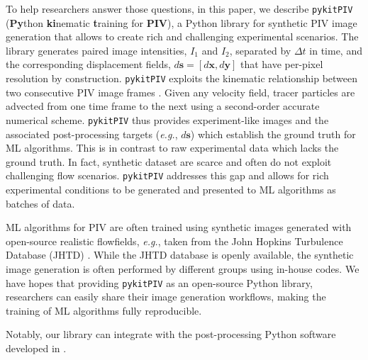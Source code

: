 \documentclass[a4paper,fleqn]{cas-dc}
\begin{document}
To help researchers answer those questions, in this paper, we describe \texttt{pykitPIV} (\textbf{Py}thon \textbf{ki}nematic \textbf{t}raining for \textbf{PIV}), a Python library for synthetic PIV image generation that allows to create rich and challenging experimental scenarios. The library generates paired image intensities, $I_1$ and $I_2$, separated by $\Delta t$ in time, and the corresponding displacement fields, $d\mathbf{s} = [d \mathbf{x}, d\mathbf{y}]$ that have per-pixel resolution by construction. \texttt{pykitPIV} exploits the kinematic relationship between two consecutive PIV image frames \cite{manickathan2022kinematic}. Given any velocity field, tracer particles are advected from one time frame to the next using a second-order accurate numerical scheme. \texttt{pykitPIV} thus provides experiment-like images and the associated post-processing targets (\textit{e.g.}, $d\mathbf{s}$) which establish the ground truth for ML algorithms. This is in contrast to raw experimental data which lacks the ground truth. In fact, synthetic dataset are scarce and often do not exploit challenging flow scenarios. \texttt{pykitPIV} addresses this gap and allows for rich experimental conditions to be generated and presented to ML algorithms as batches of data.

ML algorithms for PIV are often trained using synthetic images generated with open-source realistic flowfields, \textit{e.g.}, taken from the John Hopkins Turbulence Database (JHTD) \cite{perlman2007data}. While the JHTD database is openly available, the synthetic image generation is often performed by different groups using in-house codes. We have hopes that providing \texttt{pykitPIV} as an open-source Python library, researchers can easily share their image generation workflows, making the training of ML algorithms fully reproducible.

Notably, our library can integrate with the post-processing Python software developed in \cite{aguilar2022dpivsoft}.


\end{document}
